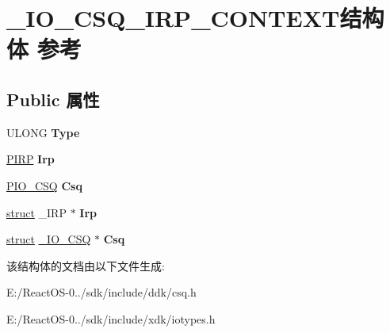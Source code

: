 \hypertarget{struct___i_o___c_s_q___i_r_p___c_o_n_t_e_x_t}{}\section{\+\_\+\+I\+O\+\_\+\+C\+S\+Q\+\_\+\+I\+R\+P\+\_\+\+C\+O\+N\+T\+E\+X\+T结构体 参考}
\label{struct___i_o___c_s_q___i_r_p___c_o_n_t_e_x_t}
\subsection*{Public 属性}
\begin{DoxyCompactItemize}
\item 
\mbox{\label{struct___i_o___c_s_q___i_r_p___c_o_n_t_e_x_t_a314190555d19509bdf4740485fcb30da}} 
U\+L\+O\+NG {\bfseries Type}
\item 
\mbox{\label{struct___i_o___c_s_q___i_r_p___c_o_n_t_e_x_t_a663e8b8531387242f8d477be5f7a689f}} 
\hyperlink{interfacevoid}{P\+I\+RP} {\bfseries Irp}
\item 
\mbox{\label{struct___i_o___c_s_q___i_r_p___c_o_n_t_e_x_t_a17795ba7c80a78fb1e39c5324427b164}} 
\hyperlink{struct___i_o___c_s_q}{P\+I\+O\+\_\+\+C\+SQ} {\bfseries Csq}
\item 
\mbox{\label{struct___i_o___c_s_q___i_r_p___c_o_n_t_e_x_t_ad9ed5c0b2bf0a9e201c32d9036b7eadd}} 
\hyperlink{interfacestruct}{struct} \+\_\+\+I\+RP $\ast$ {\bfseries Irp}
\item 
\mbox{\label{struct___i_o___c_s_q___i_r_p___c_o_n_t_e_x_t_a5eb334d370165ff65ba6a9457d8468cf}} 
\hyperlink{interfacestruct}{struct} \hyperlink{struct___i_o___c_s_q}{\+\_\+\+I\+O\+\_\+\+C\+SQ} $\ast$ {\bfseries Csq}
\end{DoxyCompactItemize}


该结构体的文档由以下文件生成\+:\begin{DoxyCompactItemize}
\item 
E\+:/\+React\+O\+S-\/0../sdk/include/ddk/csq.\+h\item 
E\+:/\+React\+O\+S-\/0../sdk/include/xdk/iotypes.\+h\end{DoxyCompactItemize}
